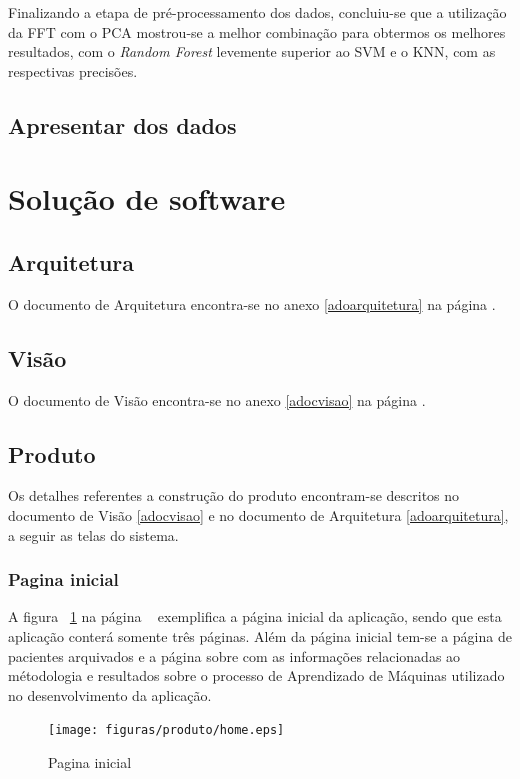 Finalizando a etapa de pré-processamento dos dados, concluiu-se que a utilização da FFT com o PCA mostrou-se a melhor combinação para obtermos os melhores resultados, com o \textit{Random Forest} levemente superior ao SVM e o KNN, com as respectivas precisões.

\subsection{Apresentar dos dados}

\section{Solução de software}
\subsection{Arquitetura}
O documento de Arquitetura encontra-se no anexo \ref{adoarquitetura} na página \pageref{adoarquitetura}.

\subsection{Visão}
O documento de Visão encontra-se no anexo \ref{adocvisao} na página \pageref{adocvisao}.

\subsection{Produto}
Os detalhes referentes a construção do produto encontram-se descritos no documento de Visão \ref{adocvisao} e no documento de Arquitetura \ref{adoarquitetura}, a seguir as telas do sistema.


\subsubsection{Pagina inicial}
A figura ~\ref{fighome} na página ~\pageref{fighome} exemplifica a página inicial da aplicação, sendo que esta aplicação  conterá somente três páginas. Além da página inicial tem-se a página de pacientes arquivados e a página sobre com as informações relacionadas ao métodologia e resultados sobre o processo de Aprendizado de Máquinas utilizado no desenvolvimento da aplicação.

\begin{figure}[!htb]
    \centering
    \texttt{[image: figuras/produto/home.eps]}
    \caption{Pagina inicial}
    \label{fighome}
\end{figure}

